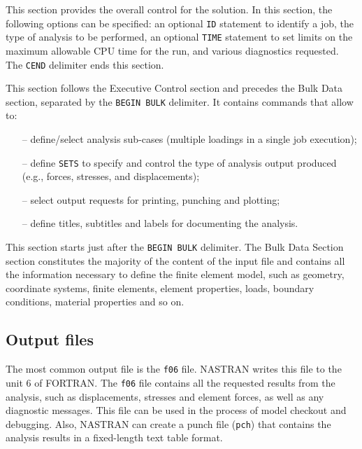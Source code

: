 \begin{description}[style=sameline]
\item[Executive Control Section] This section provides the overall control for the solution. In this section, the following options can be specified: an optional \texttt{ID} statement to identify a job, the type of analysis to be performed, an optional \texttt{TIME} statement to set limits on the maximum allowable CPU time for the run, and various diagnostics requested. The \texttt{CEND} delimiter ends this section.
\item[Case Control Section] This section follows the Executive Control section and precedes the Bulk Data section, separated by the \texttt{BEGIN BULK} delimiter. It contains commands that allow to:
\vspace{1em}
\begin{itemize}[leftmargin=\parindent]
    \item[--] define/select analysis sub-cases (multiple loadings in a single job execution);
    \item[--] define \texttt{SETS} to specify and control the type of analysis output produced (e.g., forces, stresses, and displacements);
    \item[--] select output requests for printing, punching and plotting;
    \item[--] define titles, subtitles and labels for documenting the analysis.
\end{itemize}

\item[Bulk Data Section] This section starts just after the \texttt{BEGIN BULK} delimiter. The Bulk Data Section section constitutes the majority of the content of the input file and contains all the information necessary to define the finite element model, such as geometry, coordinate systems, finite elements, element properties, loads, boundary conditions, material properties and so on.
\end{description}

\subsection{Output files}

The most common output file is the \texttt{f06} file. NASTRAN writes this file to the unit 6 of FORTRAN. The \texttt{f06} file contains all the requested results from the analysis, such as displacements, stresses and element forces, as well as any diagnostic messages. This file can be used in the process of model checkout and debugging. Also, NASTRAN can create a punch file (\texttt{pch}) that contains the analysis results in a fixed-length text table format.

